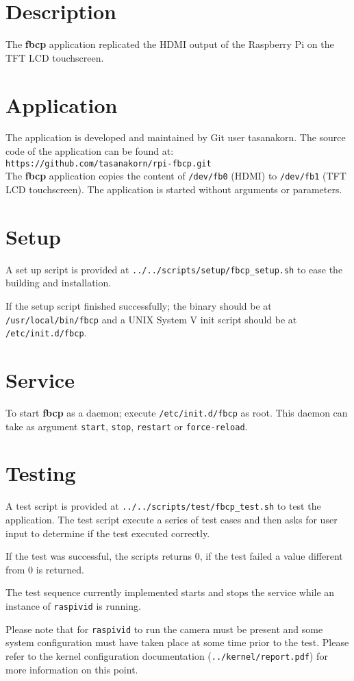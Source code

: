 \section{Description}
The \textbf{fbcp} application replicated the HDMI output of the Raspberry Pi on
the TFT LCD touchscreen.

\section{Application}
The application is developed and maintained by Git user tasanakorn. The source
code of the application can be found at:\\

\texttt{https://github.com/tasanakorn/rpi-fbcp.git}\\

The \textbf{fbcp} application copies the content of \texttt{/dev/fb0} (HDMI) to
\texttt{/dev/fb1} (TFT LCD touchscreen). The application is started without
arguments or parameters.

\section{Setup}
A set up script is provided at \texttt{../../scripts/setup/fbcp\_setup.sh} to
ease the building and installation.

If the setup script finished successfully; the binary should be at\\
\texttt{/usr/local/bin/fbcp} and a UNIX System V init script should be at\\
\texttt{/etc/init.d/fbcp}.

\section{Service}
To start \textbf{fbcp} as a daemon; execute \texttt{/etc/init.d/fbcp}
as root. This daemon can take as argument \texttt{start}, \texttt{stop},
\texttt{restart} or \texttt{force-reload}.

\section{Testing}
A test script is provided at \texttt{../../scripts/test/fbcp\_test.sh} to test
the application. The test script execute a series of test cases and then asks
for user input to determine if the test executed correctly.

If the test was successful, the scripts returns 0, if the test failed a value
different from 0 is returned.

The test sequence currently implemented starts and stops the service while an
instance of \texttt{raspivid} is running.

Please note that for \texttt{raspivid} to run the camera must be present and
some system configuration must have taken place at some time prior to the test.
Please refer to the kernel configuration documentation
(\texttt{../kernel/report.pdf}) for more information on this point.
